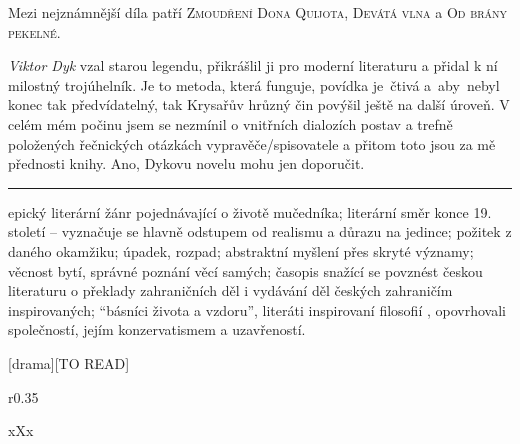\documentclass{extarticle} %
\begin{document}
\noindent 
Mezi nejznámnější díla patří \textsc{Zmoudření Dona Quijota}, \textsc{Devátá vlna} a \textsc{Od brány pekelné}.






\noindent 
\textit{Viktor Dyk} vzal starou legendu, přikrášlil ji pro moderní literaturu a přidal k ní milostný trojúhelník.
Je to metoda, která funguje, povídka je~čtivá a~aby~nebyl konec tak předvídatelný, tak Krysařův hrůzný čin povýšil ještě na další úroveň.
V celém mém počinu jsem se nezmínil o vnitřních dialozích postav a trefně položených řečnických otázkách vypravěče/spisovatele a přitom toto jsou za mě přednosti knihy.
Ano, Dykovu novelu mohu jen doporučit.

\vfill

\noindent\begin{minipage}{\textwidth}
    {\textcolor{\wpagecolor}{\rule{\linewidth}{0.4pt}}
    \footnotesize
     epický literární žánr pojednávající o životě mučedníka;
     literární směr konce 19. století -- vyznačuje se hlavně odstupem od realismu a důrazu na jedince;
     požitek z daného okamžiku;
     úpadek, rozpad;
     abstraktní myšlení přes skryté významy;
     věcnost bytí, správné poznání věcí samých;
     časopis snažící se povznést českou literaturu o překlady zahraničních děl i vydávání děl českých zahraničím inspirovaných;
     \enquote{básníci života a vzdoru}, literáti inspirovaní filosofií , opovrhovali společností, jejím konzervatismem a uzavřeností.
    }
\end{minipage}

\newpage


\changefontsize{8pt}

[drama][TO READ]

\noindent\begin{wrapfigure}{r}{0.35\textwidth}
\tiny

\setlength{\parindent}{3pt}
xXx
\end{wrapfigure}
\end{document}

